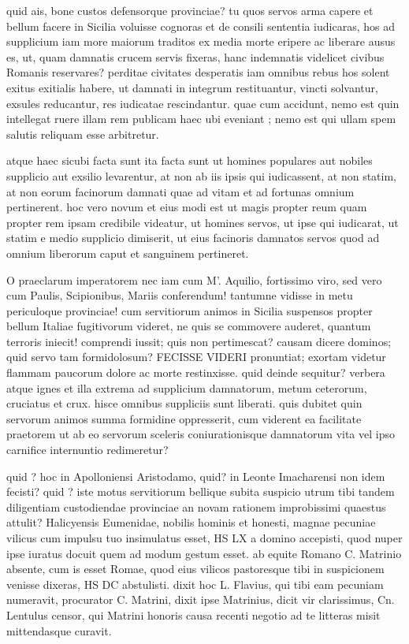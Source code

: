  quid ais, bone custos defensorque provinciae? tu quos servos arma capere et bellum facere in Sicilia voluisse cognoras et de consili sententia iudicaras, hos ad supplicium iam more maiorum traditos ex media morte eripere ac liberare ausus es, ut, quam damnatis crucem servis fixeras, hanc indemnatis videlicet civibus Romanis reservares? perditae civitates desperatis iam omnibus rebus hos solent exitus exitialis habere, ut damnati in integrum restituantur, vincti solvantur, exsules reducantur, res iudicatae rescindantur. quae cum accidunt, nemo est quin intellegat ruere illam rem publicam haec ubi eveniant ; nemo est qui ullam spem salutis reliquam esse arbitretur.

 atque haec sicubi facta sunt ita facta sunt ut homines populares aut nobiles supplicio aut exsilio levarentur, at non ab iis ipsis qui iudicassent, at non statim, at non eorum facinorum damnati quae ad vitam et ad fortunas omnium pertinerent. hoc vero novum et eius modi est ut magis propter reum quam propter rem ipsam credibile videatur, ut homines servos, ut ipse qui iudicarat, ut statim e medio supplicio dimiserit, ut eius facinoris damnatos servos quod ad omnium liberorum caput et sanguinem pertineret.

 O praeclarum imperatorem nec iam cum M'. Aquilio, fortissimo viro, sed vero cum Paulis, Scipionibus, Mariis conferendum! tantumne vidisse in metu periculoque provinciae! cum servitiorum animos in Sicilia suspensos propter bellum Italiae fugitivorum videret, ne quis se commovere auderet, quantum terroris iniecit! comprendi iussit; quis non pertimescat? causam dicere dominos; quid servo tam formidolosum? FECISSE VIDERI pronuntiat; exortam videtur flammam paucorum dolore ac morte restinxisse. quid deinde sequitur? verbera atque ignes et illa extrema ad supplicium damnatorum, metum ceterorum, cruciatus et crux. hisce omnibus suppliciis sunt liberati. quis dubitet quin servorum animos summa formidine oppresserit, cum viderent ea facilitate praetorem ut ab eo servorum sceleris coniurationisque damnatorum vita vel ipso carnifice internuntio redimeretur?

 quid ? hoc in Apolloniensi Aristodamo, quid? in Leonte Imacharensi non idem fecisti? quid ? iste motus servitiorum bellique subita suspicio utrum tibi tandem diligentiam custodiendae provinciae an novam rationem improbissimi quaestus attulit? Halicyensis Eumenidae, nobilis hominis et honesti, magnae pecuniae vilicus cum impulsu tuo insimulatus esset, HS LX a domino accepisti, quod nuper ipse iuratus docuit quem ad modum gestum esset. ab equite Romano C. Matrinio absente, cum is esset Romae, quod eius vilicos pastoresque tibi in suspicionem venisse dixeras, HS DC abstulisti. dixit hoc L. Flavius, qui tibi eam pecuniam numeravit, procurator C. Matrini, dixit ipse Matrinius, dicit vir clarissimus, Cn. Lentulus censor, qui Matrini honoris causa recenti negotio ad te litteras misit mittendasque curavit.


